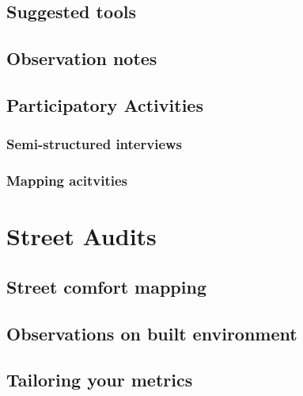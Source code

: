 \documentclass[
]{latex/krantz}
\begin{document}
\hypertarget{suggested-tools}{%
\subsection{Suggested tools}\label{suggested-tools}}

\hypertarget{observation-notes}{%
\subsection{Observation notes}\label{observation-notes}}

\hypertarget{participatory-activities}{%
\subsection{Participatory Activities}\label{participatory-activities}}

\hypertarget{semi-structured-interviews}{%
\subsubsection{Semi-structured interviews}\label{semi-structured-interviews}}

\hypertarget{mapping-acitvities}{%
\subsubsection{Mapping acitvities}\label{mapping-acitvities}}

\hypertarget{street-audits}{%
\section{Street Audits}\label{street-audits}}

\hypertarget{street-comfort-mapping}{%
\subsection{Street comfort mapping}\label{street-comfort-mapping}}

\hypertarget{observations-on-built-environment}{%
\subsection{Observations on built environment}\label{observations-on-built-environment}}

\hypertarget{tailoring-your-metrics}{%
\subsection{Tailoring your metrics}\label{tailoring-your-metrics}}
\end{document}
